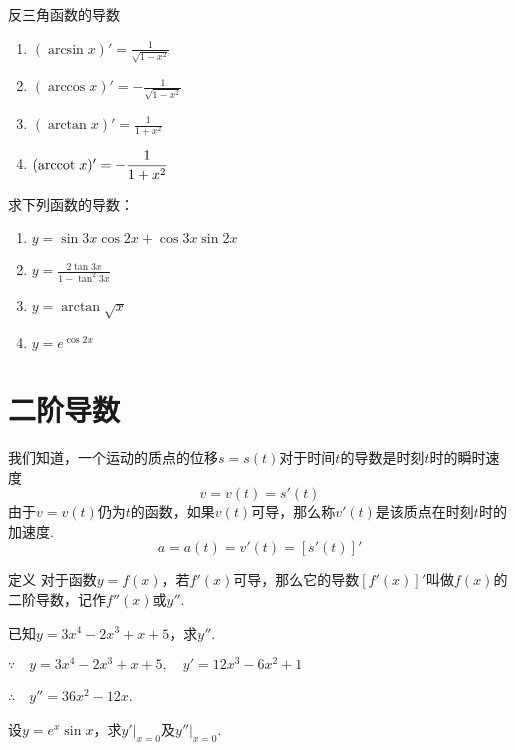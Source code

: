 \begin{thm}{反三角函数的导数}
\begin{multicols}{2}
  \begin{enumerate}[(1)]
    \item $(\arcsin x)' =\frac{1}{\sqrt{1-x^{2}}}$
    \item $(\arccos x)' =-\frac{1}{\sqrt{1-x^{2}}}$
    \item $(\arctan x)'=\frac{1}{1+x^2}$
    \item $({\rm arccot\;} x)'=-\frac{1}{1+x^2}$
\end{enumerate}  
\end{multicols}
\end{thm}

\begin{ex}
    求下列函数的导数：
 \begin{enumerate}
    \item $y=\sin 3x\cos 2x+\cos 3x\sin 2x$
    \item $y=\frac{2\tan 3x}{1-\tan^2 3x}$
    \item $y=\arctan\sqrt{x}$
    \item $y=e^{\cos 2x}$
\end{enumerate}   
\end{ex}

\section{二阶导数}
我们知道，一个运动的质点的位移$s=s(t)$对于时间$t$的导数是时刻$t$时的瞬时速度
\[v=v(t)=s'(t)\]
由于$v=v(t)$仍为$t$的函数，如果$v(t)$可导，那么称$v'(t)$是该质点在时刻$t$时的加速度.
\[ a=a(t)=v'(t)=[s'(t)]'  \]

\begin{thm}
{定义} 对于函数$y=f(x)$，若$f'(x)$可导，那么它的导数$[f'(x)]'$叫做$f(x)$的二阶导数，记作$f''(x)$或$y''$.
\end{thm}


\begin{example}
    已知$y=3x^4-2x^3+x+5$，求$y''$.
\end{example}

\begin{solution}
$\because\quad y=3x^4-2x^3+x+5,\quad y'=12x^3-6x^2+1$

$\therefore\quad y''=36x^2-12x$.
\end{solution}

\begin{example}
    设$y=e^x\sin x$，求$y'\big|_{x=0}$及$y''\big|_{x=0}$.
\end{example}


